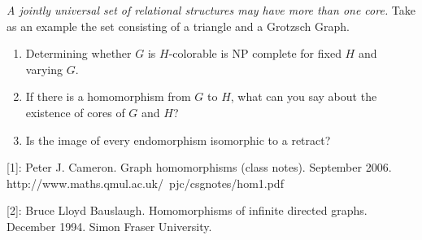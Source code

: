 \documentclass{article}
\begin{document}
\emph{A jointly universal set of relational structures may have more
  than one core.} Take as an example the set consisting of a triangle
and a Grotzsch Graph.

\begin{enumerate}
\item Determining whether $G$ is $H$-colorable is NP complete for
  fixed $H$ and varying $G$.
\item If there is a homomorphism from $G$ to $H$, what can you say
  about the existence of cores of $G$ and $H$?
\item Is the image of every endomorphism isomorphic to a retract?
\end{enumerate}

[1]: Peter J. Cameron. Graph homomorphisms (class notes). September 2006. http://www.maths.qmul.ac.uk/~pjc/csgnotes/hom1.pdf

[2]: Bruce Lloyd Bauslaugh. Homomorphisms of infinite directed
graphs. December 1994. Simon Fraser University.
\end{document}

